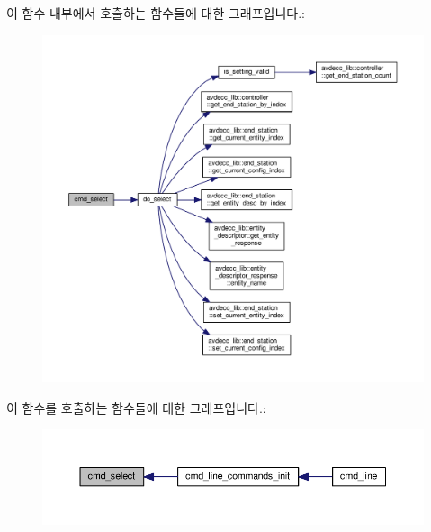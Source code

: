 이 함수 내부에서 호출하는 함수들에 대한 그래프입니다.\+:
\nopagebreak
\begin{figure}[H]
\begin{center}
\leavevmode
\includegraphics[width=350pt]{classcmd__line_a29f7f3b13e37de847ac9fb12308a1689_cgraph}
\end{center}
\end{figure}




이 함수를 호출하는 함수들에 대한 그래프입니다.\+:
\nopagebreak
\begin{figure}[H]
\begin{center}
\leavevmode
\includegraphics[width=350pt]{classcmd__line_a29f7f3b13e37de847ac9fb12308a1689_icgraph}
\end{center}
\end{figure}



